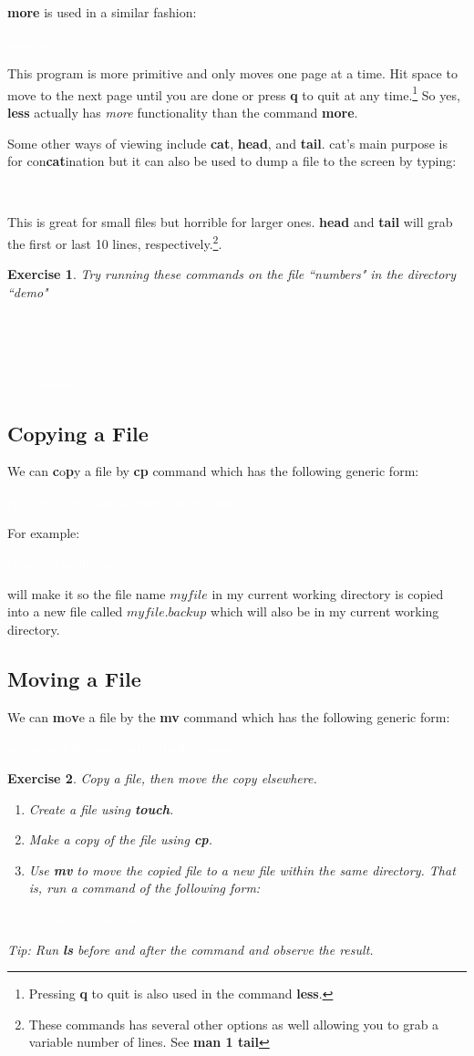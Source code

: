 \documentclass[oneside]{book}
\newcommand{\commandline}[1]{\begin{center} \colorbox{Dark}{\textcolor{white}{#1}} \end{center}}
\newtheorem{ex}{Exercise}[chapter]
\begin{document}
\textbf{more} is used in a similar fashion:
\commandline{more myfile}
This program is more primitive and only moves one page at a time. Hit space to move to the next page until you are done or press \textbf{q} to quit at any time.\footnote{Pressing \textbf{q} to quit is also used in the command \textbf{less}.} So yes,  \textbf{less} actually has \textit{more} functionality than the command \textbf{more}. 

Some other ways of viewing include \textbf{cat}, \textbf{head}, and \textbf{tail}. cat's main purpose is for con\textbf{cat}ination but it can also be used to dump a file to the screen by typing:
\commandline{cat myfile}
This is great for small files but horrible for larger ones. \textbf{head} and \textbf{tail} will grab the first or last 10 lines, respectively.\footnote{These commands has several other options as well allowing you to grab a variable number of lines. See \textbf{man 1 tail}}.\\

\begin{ex} Try running these commands on the file ``numbers" in the directory ``demo"
\commandline{cat numbers}
\commandline{more numbers}
\commandline{less numbers}

\end{ex}

\subsection{Copying a File}
We can \textbf{c}o\textbf{p}y a file by \textbf{cp} command which has the following generic form:
\commandline{cp sourceFileName destinationFileName}
For example:
\commandline{cp myfile myfile.backup}
will make it so the file name $myfile$ in my current working directory is copied into a new file called $myfile.backup$ which will also be in my current working directory.

\subsection{Moving a File}
We can \textbf{m}o\textbf{v}e a file by the \textbf{mv} command which has the following generic form:
\commandline{mv sourceFileName distinationFileName}
\vspace{0.3cm}
\begin{ex} Copy a file, then move the copy elsewhere.
    \begin{enumerate}
        \item Create a file using \textbf{touch}.
        \item Make a copy of the file using \textbf{cp}.
        \item Use \textbf{mv} to move the copied file to a new file within the same directory. That is, run a command of the following form:
        \commandline{mv file.copy file.newfile}
    \end{enumerate}
Tip: Run \textbf{ls} before and after the command and observe the result.
\end{ex}
\end{document}

